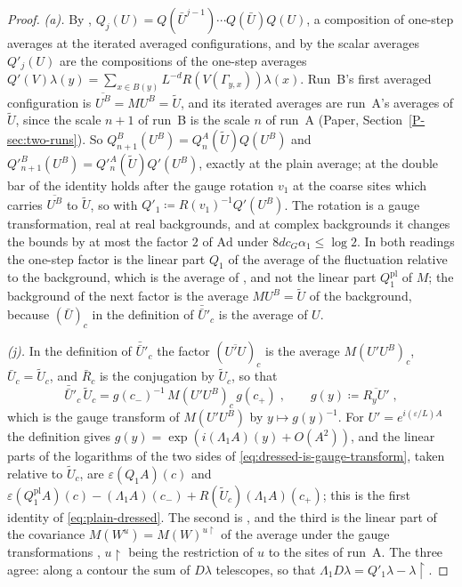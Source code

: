 \documentclass[11pt]{preprint}
\numberwithin{equation}{section}
\theoremstyle{definition}
\theoremstyle{remark}
\theoremstyle{plain}
\begin{document}
\begin{proof}
\emph{(a).} By \cite[(3.15), p.~393]{BalabanPBG}, $Q_j(U) = Q(\bar U^{j-1})\cdots Q(\bar U)Q(U)$, a composition of one-step averages at the iterated averaged configurations, and by \cite[(3.19)]{BalabanPBG} the scalar averages $Q'_j(U)$ are the compositions of the one-step averages $Q'(V)\lambda(y) = \sum_{x \in B(y)}L^{-d}R(V(\Gamma_{y,x}))\lambda(x)$. Run~B's first averaged configuration is $\overline{U^B} = MU^B = \tilde U$, and its iterated averages are run~A's averages of $\tilde U$, since the scale $n + 1$ of run~B is the scale $n$ of run~A (Paper, Section~\ref{P-sec:two-runs}). So $Q^B_{n+1}(U^B) = Q^A_n(\tilde U)Q(U^B)$ and $Q'^B_{n+1}(U^B) = Q'^A_n(\tilde U)Q'(U^B)$, exactly at the plain average; at the double bar of \cite[(78)--(80)]{BalabanAVG} the identity holds after the gauge rotation $v_1$ at the coarse sites which carries $\overline{U^B}$ to $\tilde U$, so with $Q'_1 \coloneqq R(v_1)^{-1}Q'(U^B)$. The rotation is a gauge transformation, real at real backgrounds, and at complex backgrounds it changes the bounds by at most the factor $2$ of $\mathrm{Ad}$ under $8dc_G\alpha_1 \leq \log2$. In both readings the one-step factor is the linear part $Q_1$ of the average of the fluctuation relative to the background, which is the average of \cite[(3.13)]{BalabanPBG}, and not the linear part $Q^{\mathrm{pl}}_1$ of $M$; the background of the next factor is the average $MU^B = \tilde U$ of the background, because $(\bar U)_c$ in the definition of $\bar{\bar U}'_c$ is the average \cite[(0.4)]{BalabanRG1} of $U$.

\emph{(j).} In the definition of $\bar{\bar U}'_c$ the factor $(\overline{U'U})_c$ is the average $M(U'U^B)_c$, $\bar U_c = \tilde U_c$, and $\bar R_c$ is the conjugation by $\tilde U_c$, so that
\begin{equation}\label{eq:dressed-is-gauge-transform}
    \bar{\bar U}'_c\,\tilde U_c = g(c_-)^{-1}\,M(U'U^B)_c\,g(c_+)\;,
    \qquad
    g(y) \coloneqq \overline{R_yU'}\;,
\end{equation}
which is the gauge transform of $M(U'U^B)$ by $y \mapsto g(y)^{-1}$. For $U' = e^{i(\varepsilon/L)A}$ the definition \cite[(3.113)]{BalabanPBG} gives $g(y) = \exp(i(\Lambda_1A)(y) + O(A^2))$, and the linear parts of the logarithms of the two sides of \eqref{eq:dressed-is-gauge-transform}, taken relative to $\tilde U_c$, are $\varepsilon(Q_1A)(c)$ and $\varepsilon(Q^{\mathrm{pl}}_1A)(c) - (\Lambda_1A)(c_-) + R(\tilde U_c)(\Lambda_1A)(c_+)$; this is the first identity of \eqref{eq:plain-dressed}. The second is \cite[(3.114), p.~418]{BalabanPBG}, and the third is the linear part of the covariance $M(W^u) = M(W)^{u\restriction}$ of the average under the gauge transformations \cite[(0.6), p.~253]{BalabanRG1}, $u\restriction$ being the restriction of $u$ to the sites of run~A. The three agree: along a contour the sum of $D\lambda$ telescopes, so that $\Lambda_1D\lambda = Q'_1\lambda - \lambda\restriction$.


\end{proof}
\end{document}
